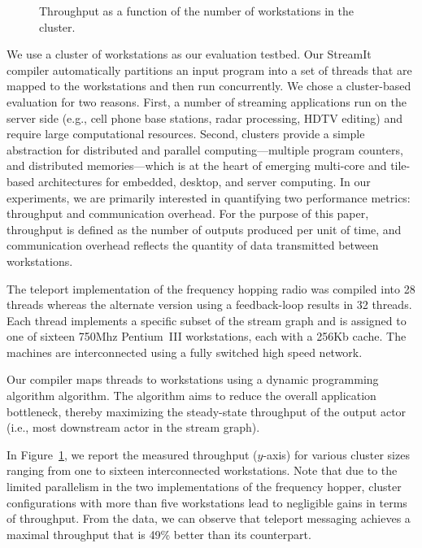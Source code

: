 \begin{figure}[t]
\vspace{-16pt}
\caption{\small Throughput as a function of the number of workstations
in the cluster. 
\protect\label{fig:fhr-throughput}}
\end{figure}

We use a cluster of workstations as our evaluation testbed. Our
StreamIt compiler automatically partitions an input program into a set
of threads that are mapped to the workstations and then run concurrently.
We chose a cluster-based evaluation for two reasons. 
First, a number of streaming applications run on the server side
(e.g., cell phone base stations, radar processing, HDTV editing) and
require large computational resources. Second, clusters provide a
simple abstraction for distributed and parallel computing---multiple program
counters, and distributed memories---which 
is at the heart of emerging multi-core and tile-based architectures
for embedded, desktop, and server computing.  In our experiments, we are primarily interested in quantifying two
performance metrics: throughput and communication overhead.
For the purpose of this paper, throughput is defined
as the number of outputs produced per unit of time, and communication
overhead reflects the quantity of data transmitted between
workstations.

The teleport implementation of the frequency hopping radio was
compiled into 28 threads whereas the alternate version using a
feedback-loop results in 32 threads.  Each thread implements a
specific subset of the stream graph and is assigned to one of sixteen
750Mhz Pentium~III workstations, each with a 256Kb cache.  The
machines are interconnected using a fully switched high speed network.

Our compiler maps threads to workstations using a dynamic programming
algorithm algorithm.  The algorithm aims to reduce the overall
application bottleneck, thereby maximizing the steady-state throughput
of the output actor (i.e., most downstream actor in the stream graph).

In Figure~\ref{fig:fhr-throughput}, we report the measured throughput
($y$-axis) for various cluster sizes ranging from one to sixteen
interconnected workstations. Note that due to the limited parallelism
in the two implementations of the frequency hopper, cluster
configurations with more than five workstations lead to negligible
gains in terms of throughput. From the data, we can observe that
teleport messaging achieves a maximal throughput that is 49\% better
than its counterpart. %

